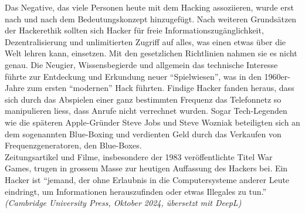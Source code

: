 \documentclass[11pt, a4paper]{article}
\begin{document}
Das Negative, das viele Personen heute mit dem Hacking assoziieren, wurde erst nach und nach dem Bedeutungskonzept hinzugefügt. Nach weiteren Grundsätzen der Hackerethik sollten sich Hacker für freie Informationszugänglichkeit, Dezentralisierung und unlimitierten Zugriff auf alles, was einen etwas über die Welt lehren kann, einsetzen. Mit den gesetzlichen Richtlinien nahmen sie es nicht genau. Die Neugier, Wissensbegierde und allgemein das technische Interesse führte zur Entdeckung und Erkundung neuer ``Spielwiesen'', was in den 1960er-Jahre zum ersten ``modernen'' Hack führten. Findige Hacker fanden heraus, dass sich durch das Abspielen einer ganz bestimmten Frequenz das Telefonnetz so manipulieren liess, dass Anrufe nicht verrechnet wurden. Sogar Tech-Legenden wie die späteren Apple-Gründer Steve Jobs und Steve Wozniak beteiligten sich an dem sogenannten Blue-Boxing und verdienten Geld durch das Verkaufen von Frequenzgeneratoren, den Blue-Boxes. \\Zeitungsartikel und Filme, insbesondere der 1983 veröffentlichte Titel War Games, trugen in grossem Masse zur heutigen Auffassung des Hackers bei.  Ein Hacker ist ``jemand, der ohne Erlaubnis in die Computersysteme anderer Leute eindringt, um Informationen herauszufinden oder etwas Illegales zu tun.'' \textit{(Cambridge University Press, Oktober 2024, übersetzt mit DeepL)} \cite{bpbKleineGeschichte:online, CambridgeHacker:online}
\end{document}
